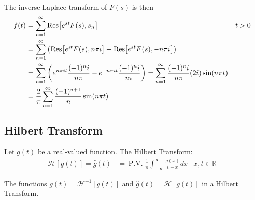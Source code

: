 \documentclass[12pt, english]{book}
\makeatletter
\renewenvironment{proof}[1][\proofname]{\par
	\pushQED{\qed}%
	\normalfont \topsep6\p@\@plus6\p@\relax
	\list{}{%
		\settowidth{\leftmargin}{\itshape\proofname:\hskip\labelsep}%
		\setlength{\labelwidth}{0pt}%
		\setlength{\itemindent}{-\leftmargin}%
		}%
	\item[\hskip\labelsep\itshape#1\@addpunct{:}]\ignorespaces
	}{\popQED\endlist\@endpefalse}
\makeatother
\begin{document}
\begin{example}
\begin{proof}
{\begin{align*}
			\end{align*}
			The inverse Laplace transform of \(F(s)\) is then
			\begin{align*}
				f(t) 
				&= \sum_{n=1}^{\infty} \Res[e^{st} F(s), s_n]
						& t>0 \\
				&= \sum_{n=1}^{\infty} \left(\Res[e^{st}F(s), n\pi i] + \Res[e^{st}F(s), -n\pi i] \right) \\
				&= \sum_{n=1}^{\infty} \left(e^{n\pi i t} \frac{(-1)^{n} i}{n\pi} - e^{-n\pi i t} \frac{(-1)^{n} i}{n\pi}\right) 
				 = \sum_{n=1}^{\infty} \frac{(-1)^{n} i}{n\pi} (2i) \sin(n\pi t) \\
				&= \frac{2}{\pi} \sum_{n=1}^{\infty} \frac{(-1)^{n+1}}{n} \sin(n\pi t)
			\end{align*}
			}
		\end{proof}
	\end{example}

	\subsection{Hilbert Transform} \label{Hilbert Transform Subsection - Complex}
	
	\begin{definition}
		\label{Hilbert Transform Definition - Complex}
		Let \(g(t)\) be a real-valued function. The Hilbert Transform:
		\begin{align*}
			\mathcal{H}[g(t)] = \hat{g}(t)
			&= \operatorname{P.V.} \frac{1}{\pi}\int_{-\infty}^{\infty} \frac{g(x)}{t-x} dx  
				& x, t \in \mathbb{R}
		\end{align*}
	\end{definition}

	\begin{definition}
		\label{Hilbert Transform Pairs Definition - Complex}
		The functions \(g(t) = \mathcal{H}^{-1}[g(t)]\) and \(\hat{g}(t) = \mathcal{H}[g(t)]\) in a Hilbert Transform.
	\end{definition}
\end{document}
